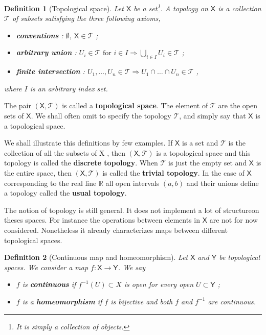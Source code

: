 \documentclass[11pt]{book}
\newcommand{\Tcal}{\mathcal{T}}
\newcommand{\Rbb}{\mathbb{R}}
\newcommand{\Xsf}{\mathsf{X}}
\newcommand{\Ysf}{\mathsf{Y}}
\theoremstyle{break}
\newtheorem{definition}{Definition}[chapter]
\begin{document}
\begin{definition}[Topological space] 
Let $\Xsf$ be a set\footnote{It is simply a collection of objects.}. A topology on $\Xsf$ is a collection $\Tcal$ of subsets satisfying the three following axioms,%
%
\begin{itemize}
\item \textbf{conventions} : $\emptyset , \ \Xsf \in \Tcal$ ;
\item \textbf{arbitrary union} : $U_i \in \Tcal \mbox{ for } i \in I \Longrightarrow \bigcup_{i\in I} U_i \in \Tcal$ ;
\item \textbf{finite intersection} : $U_1 , \dots , U_n \in \Tcal \Longrightarrow U_1 \cap \dots \cap U_n \in \Tcal$ ,
\end{itemize}
%
where $I$ is an arbitrary index set.
\end{definition}
%
The pair $(\Xsf,\Tcal)$ is called a \textbf{topological space}. The element of $\Tcal$ are the open sets of $\Xsf$. We shall often omit to specify the topology $\Tcal$, and simply say that $\Xsf$ is a topological space. 


\bigskip


We shall illustrate this definitions by few examples. If $\Xsf$ is a set and $\Tcal$ is the collection of all the subsets of X , then $(\Xsf,\Tcal)$ is a topological space and this topology is called the \textbf{discrete topology}. When $\Tcal$ is just the empty set and $\Xsf$ is the entire space, then $(\Xsf,\Tcal)$ is called the \textbf{trivial topology}. In the case of $\Xsf$ corresponding to the real line $\Rbb$ all open intervals $(a,b)$ and their unions define a topology called the \textbf{usual topology}. 


\bigskip


The notion of topology is still general. It does not implement a lot of structureon theses spaces. For instance the operations between elements in $\Xsf$ are not for now considered. Nonetheless it already characterizes maps between different topological spaces.


\begin{definition}[Continuous map and homeomorphism]
%
Let $\Xsf$ and $\Ysf$ be topological spaces. We consider a map $f : \Xsf \to \Ysf$. We say
%
\begin{itemize}
\item $f$ is \textbf{continuous} if $f^{-1}(U) \subset X$ is open for every open $U \subset\Ysf$ ;
\item $f$ is a \textbf{homeomorphism} if $f$ is bijective and both $f$ and $f^{-1}$ are continuous.
\end{itemize}
%
\end{definition}
\end{document}
